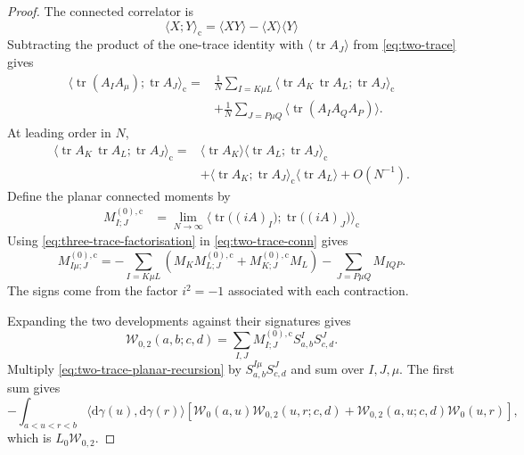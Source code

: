 \documentclass[10pt,a4paper]{amsart}
\DeclareMathOperator{\tr}{tr}
\newcommand{\cW}{\mathcal{W}}
\newcommand{\dd}{\mathrm{d}}
\begin{document}
\begin{proof}
The connected correlator is
\begin{equation}
\langle X;Y\rangle_{\mathrm c}
=
\langle XY\rangle-\langle X\rangle\langle Y\rangle
\end{equation}
Subtracting the product of the one-trace identity with $\langle\tr A_J\rangle$ from \eqref{eq:two-trace} gives
\begin{equation}\label{eq:two-trace-conn}
\begin{aligned}
\bigl\langle\tr(A_I A_\mu);\tr A_J\bigr\rangle_{\mathrm c} =& \frac{1}{N}\sum_{I=K\mu L} \bigl\langle\tr A_K\,\tr A_L;\tr A_J\bigr\rangle_{\mathrm c}
\\ &+ \frac{1}{N}\sum_{J=P\mu Q} \bigl\langle\tr(A_I A_Q A_P)\bigr\rangle.
\end{aligned}
\end{equation}
At leading order in $N$,
\begin{equation}\label{eq:three-trace-factorisation}
\begin{aligned}
\bigl\langle\tr A_K\,\tr A_L;\tr A_J\bigr\rangle_{\mathrm c}
=& \langle\tr A_K\rangle \bigl\langle\tr A_L;\tr A_J\bigr\rangle_{\mathrm c}
\\ &+ \bigl\langle\tr A_K;\tr A_J\bigr\rangle_{\mathrm c} \langle\tr A_L\rangle +O(N^{-1}).
\end{aligned}
\end{equation}
Define the planar connected moments by
\begin{equation}\label{eq:planar-connected-moments}
\begin{aligned}
M^{(0),\mathrm c}_{I;J}
&=
\lim_{N\to\infty}
\bigl\langle
\tr\bigl((iA)_I\bigr);
\tr\bigl((iA)_J\bigr)
\bigr\rangle_{\mathrm c}
\end{aligned}
\end{equation}
Using \eqref{eq:three-trace-factorisation} in \eqref{eq:two-trace-conn} gives
\begin{equation}\label{eq:two-trace-planar-recursion}
M^{(0),\mathrm c}_{I\mu;J} = -\sum_{I=K\mu L} \left( M_K M^{(0),\mathrm c}_{L;J} + M^{(0),\mathrm c}_{K;J}M_L \right) -\sum_{J=P\mu Q}M_{IQP}.
\end{equation}
The signs come from the factor $i^2=-1$ associated with each
contraction.

Expanding the two developments against their signatures gives
\begin{equation}\label{eq:W02-signature-expansion}
\cW_{0,2}(a,b;c,d) = \sum_{I,J} M^{(0),\mathrm c}_{I;J} S^I_{a,b}S^J_{c,d}.
\end{equation}
Multiply \eqref{eq:two-trace-planar-recursion} by $S^{I\mu}_{a,b}S^J_{c,d}$ and sum over $I,J,\mu$. The first sum gives
\begin{equation}
-\int_{a<u<r<b} \bigl\langle\dd\gamma(u),\dd\gamma(r)\bigr\rangle \left[ \cW_0(a,u)\cW_{0,2}(u,r;c,d) + \cW_{0,2}(a,u;c,d)\cW_0(u,r) \right],
\end{equation}
which is $L_0\cW_{0,2}$.


\end{proof}
\end{document}
